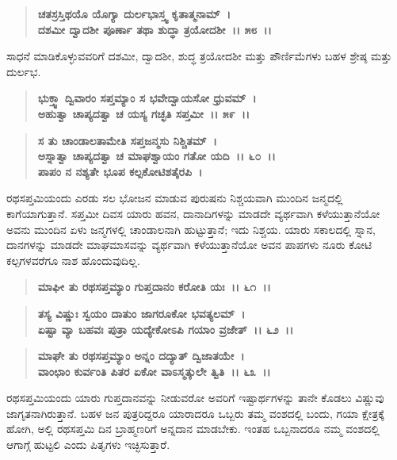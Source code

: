 \begin{verse}
\textbf{ಚತಸ್ರಸ್ತಿಥಯೊ ಯೊಗ್ಯಾ ದುರ್ಲಭಾಸ್ತ್ವ ಕೃತಾತ್ಮನಾಮ್~।}\\\textbf{ದಶಮೀ ದ್ವಾದಶೀ ಪೂರ್ಣಾ ತಥಾ ಶುದ್ಧಾ ತ್ರಯೋದಶೀ~।। ೫೮~।।}
\end{verse}

ಸಾಧನೆ ಮಾಡಿಕೊಳ್ಳುವವರಿಗೆ ದಶಮೀ, ದ್ವಾದಶೀ, ಶುದ್ಧ ತ್ರಯೋದಶೀ ಮತ್ತು ಪೌರ್ಣಿಮೆಗಳು ಬಹಳ ಶ್ರೇಷ್ಠ ಮತ್ತು ದುರ್ಲಭ.

\begin{verse}
\textbf{ಭುಕ್ತ್ವಾ ದ್ವಿವಾರಂ ಸಪ್ತಮ್ಯಾಂ ಸ ಭವೇದ್ವಾಯಸೋ ಧ್ರುವಮ್~।}\\\textbf{ಅಹುತ್ವಾ ಚಾಪ್ಯದತ್ವಾ ಚ ಯಸ್ಯ ಗಚ್ಛತಿ ಸಪ್ತಮೀ~।। ೫೯~।।}
\end{verse}

\begin{verse}
\textbf{ಸ ತು ಚಾಂಡಾಲತಾಮೇತಿ ಸಪ್ತಜನ್ಮಸು ನಿಶ್ಚಿತಮ್~।}\\\textbf{ಅಸ್ನಾತ್ವಾ ಚಾಪ್ಯದತ್ವಾ ಚ ಮಾಘಶ್ವಾಯಂ ಗತೋ ಯದಿ~।। ೬೦~।। }\\\textbf{ಪಾಪಂ ನ ನಶ್ಯತೇ ಭೂಪ ಕಲ್ಪಕೋಟಿಶತೈರಪಿ~।}
\end{verse}

ರಥಸಪ್ತಮಿಯಂದು ಎರಡು ಸಲ ಭೋಜನ ಮಾಡುವ ಪುರುಷನು ನಿಶ್ಚಯವಾಗಿ ಮುಂದಿನ ಜನ್ಮದಲ್ಲಿ ಕಾಗೆಯಾಗುತ್ತಾನೆ. ಸಪ್ತಮೀ ದಿವಸ ಯಾರು ಹವನ, ದಾನಾದಿಗಳನ್ನು ಮಾಡದೇ ವ್ಯರ್ಥವಾಗಿ ಕಳೆಯುತ್ತಾನೆಯೋ ಅವನು ಮುಂದಿನ ಏಳು ಜನ್ಮಗಳಲ್ಲಿ ಚಾಂಡಾಲನಾಗಿ ಹುಟ್ಟುತ್ತಾನೆ; ಇದು ನಿಶ್ಚಯ. ಯಾರು ಸಕಾಲದಲ್ಲಿ ಸ್ನಾನ, ದಾನಗಳನ್ನು ಮಾಡದೇ ಮಾಘಮಾಸವನ್ನು ವ್ಯರ್ಥವಾಗಿ ಕಳೆಯುತ್ತಾನೆಯೋ ಅವನ ಪಾಪಗಳು ನೂರು ಕೋಟಿ ಕಲ್ಪಗಳವರೆಗೂ ನಾಶ ಹೊಂದುವುದಿಲ್ಲ.

\begin{verse}
\textbf{ಮಾಘೀ ತು ರಥಸಪ್ತಮ್ಯಾಂ ಗುಪ್ತದಾನಂ ಕರೋತಿ ಯಃ~।। ೬೧~।।} 
\end{verse}

\begin{verse}
\textbf{ತಸ್ಯ ವಿಷ್ಣುಃ ಸ್ವಯಂ ದಾತುಂ ಜಾಗರೂಕೋ ಭವತ್ಯಲಮ್~।}\\\textbf{ಏಷ್ಟಾ ವ್ಯಾ ಬಹವಃ ಪುತ್ರಾ ಯದ್ಯೇಕೋಽಪಿ ಗಯಾಂ ವ್ರಜೇತ್~।। ೬೨~।। }
\end{verse}

\begin{verse}
\textbf{ಮಾಘೇ ತು ರಥಸಪ್ತಮ್ಯಾಂ ಅನ್ನಂ ದದ್ಯಾತ್ ದ್ವಿಜಾತಯೇ~।}\\\textbf{ವಾಂಛಾಂ ಕುರ್ವಂತಿ ಪಿತರ ಏಕೋ ವಾಽಸ್ಮತ್ಕುಲೇ ತ್ವಿತಿ~।। ೬೩~।।}
\end{verse}

ರಥಸಪ್ತಮಿಯಂದು ಯಾರು ಗುಪ್ತದಾನವನ್ನು ನೀಡುವರೋ ಅವರಿಗೆ ಇಷ್ಟಾರ್ಥಗಳನ್ನು ತಾನೇ ಕೊಡಲು ವಿಷ್ಣುವು ಜಾಗೃತನಾಗಿರುತ್ತಾನೆ. ಬಹಳ ಜನ ಪುತ್ರರಿದ್ದರೂ ಯಾರಾದರೂ ಒಬ್ಬರು ತಮ್ಮ ವಂಶದಲ್ಲಿ ಬಂದು, ಗಯಾ ಕ್ಷೇತ್ರಕ್ಕೆ ಹೋಗಿ, ಅಲ್ಲಿ ರಥಸಪ್ತಮಿ ದಿನ ಬ್ರಾಹ್ಮಣರಿಗೆ ಅನ್ನದಾನ ಮಾಡಬೇಕು. ಇಂತಹ ಒಬ್ಬನಾದರೂ ನಮ್ಮ ವಂಶದಲ್ಲಿ ಆಗಾಗ್ಗೆ ಹುಟ್ಟಲಿ ಎಂದು ಪಿತೃಗಳು ಇಚ್ಛಿಸುತ್ತಾರೆ.

